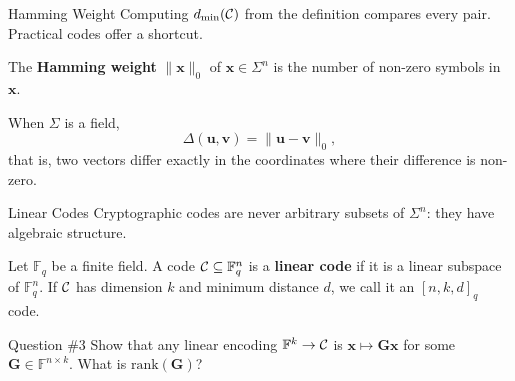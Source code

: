 \documentclass{zkdl-presentation-template}
\begin{document}
    \begin{frame}{Hamming Weight}
        Computing $d_{\min}(\mathcal{C})$ from the definition compares every pair. Practical codes offer a shortcut.
        \pause

        \begin{definition}
            The \textbf{Hamming weight} $\|\mathbf{x}\|_0$ of $\mathbf{x} \in \Sigma^n$ is the number of non-zero symbols in $\mathbf{x}$.
        \end{definition}
        \pause

        When $\Sigma$ is a field,
        \begin{equation*}
            \Delta(\mathbf{u}, \mathbf{v}) = \|\mathbf{u} - \mathbf{v}\|_0,
        \end{equation*}
        that is, two vectors differ exactly in the coordinates where their difference is non-zero.
    \end{frame}

    \begin{frame}{Linear Codes}
        Cryptographic codes are never arbitrary subsets of $\Sigma^n$: they have algebraic structure.

        \begin{definition}
            Let $\mathbb{F}_q$ be a finite field. A code $\mathcal{C} \subseteq \mathbb{F}_q^n$ is a \textbf{linear code} if it is a linear subspace of $\mathbb{F}_q^n$. If $\mathcal{C}$ has dimension $k$ and minimum distance $d$, we call it an $[n,k,d]_q$ code.
        \end{definition}
        \pause

        \begin{questionblock}{Question \#3}
            Show that any linear encoding $\mathbb{F}^k \to \mathcal{C}$ is $\mathbf{x} \mapsto \mathbf{G}\mathbf{x}$ for some $\mathbf{G} \in \mathbb{F}^{n \times k}$. What is $\text{rank}(\mathbf{G})$?
        \end{questionblock}
    \end{frame}
\end{document}
